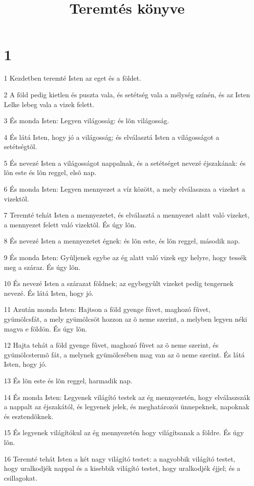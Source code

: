 

\title{Teremtés könyve}


\chapter{1}

\par 1 Kezdetben teremté Isten az eget és a földet.
\par 2 A föld pedig kietlen és puszta vala, és setétség vala a mélység színén, és az Isten Lelke lebeg vala a vizek felett.
\par 3 És monda Isten: Legyen világosság: és lõn világosság.
\par 4 És látá Isten, hogy jó a világosság; és elválasztá Isten a világosságot a setétségtõl.
\par 5 És nevezé Isten a világosságot nappalnak, és a setétséget nevezé éjszakának: és lõn este és lõn reggel, elsõ nap.
\par 6 És monda Isten: Legyen mennyezet a víz között, a mely elválaszsza a vizeket a vizektõl.
\par 7 Teremté tehát Isten a mennyezetet, és elválasztá a mennyezet alatt való vizeket, a mennyezet felett való vizektõl. És úgy lõn.
\par 8 És nevezé Isten a mennyezetet égnek: és lõn este, és lõn reggel, második nap.
\par 9 És monda Isten: Gyûljenek egybe az ég alatt való vizek egy helyre, hogy tessék meg a száraz. És úgy lõn.
\par 10 És nevezé Isten a szárazat földnek; az egybegyûlt vizeket pedig tengernek nevezé. És látá Isten, hogy jó.
\par 11 Azután monda Isten: Hajtson a föld gyenge fûvet, maghozó fûvet, gyümölcsfát, a mely gyümölcsöt hozzon az õ neme szerint, a melyben legyen néki magva e földön. És úgy lõn.
\par 12 Hajta tehát a föld gyenge fûvet, maghozó fûvet az õ neme szerint, és gyümölcstermõ fát, a melynek gyümölcsében mag van az õ neme szerint. És látá Isten, hogy jó.
\par 13 És lõn este és lõn reggel, harmadik nap.
\par 14 És monda Isten: Legyenek világító testek az ég mennyezetén, hogy elválaszszák a nappalt az éjszakától, és legyenek jelek, és meghatározói ünnepeknek, napoknak és esztendõknek.
\par 15 És legyenek világítókul az ég mennyezetén hogy világítsanak a földre. És úgy lõn.
\par 16 Teremté tehát Isten a két nagy világító testet: a nagyobbik világító testet, hogy uralkodjék nappal és a kisebbik világító testet, hogy uralkodjék éjjel; és a csillagokat.
